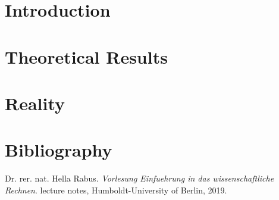 \documentclass[refman]{scrartcl}
\theoremstyle{definition}
\begin{document}
%
%

\newpage
%
%
\section{Introduction}
%

\newpage
%
\section{Theoretical Results}
%


%
%


\section{Reality}
%
\section{Bibliography}
\begin{thebibliography}{9}
    Dr. rer. nat. Hella Rabus. 
    \textit{Vorlesung Einfuehrung in das wissenschaftliche Rechnen}. 
    lecture notes, Humboldt-University of Berlin, 2019.
\end{thebibliography}
\end{document}
